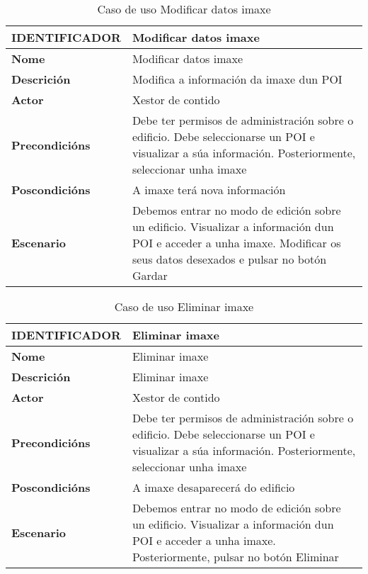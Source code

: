 \begin{table}[tbp]
	\begin{tabular}{|l|p{10cm}|}
		\hline 
		\textbf{IDENTIFICADOR}	& \textbf{Modificar datos imaxe} \\ 
		\hline 
		\textbf{Nome} & Modificar datos imaxe \\ 
		\hline 
		\textbf{Descrición} & Modifica a información da imaxe dun POI \\ 
		\hline 
		\textbf{Actor} & Xestor de contido \\ 
		\hline 
		\textbf{Precondicións} & Debe ter permisos de administración sobre o edificio. Debe seleccionarse un POI e visualizar a súa información. Posteriormente, seleccionar unha imaxe \\ 
		\hline 
		\textbf{Poscondicións} & A imaxe terá nova información \\ 
		\hline 
		\textbf{Escenario} & Debemos entrar no modo de edición sobre un edificio. Visualizar a información dun POI e acceder a unha imaxe. Modificar os seus datos desexados e pulsar no botón Gardar \\ 
		\hline 
	\end{tabular}
	\caption{Caso de uso Modificar datos imaxe}
	\label{tab:cuModificarImaxe}
\end{table}

\begin{table}[tbp]
	\begin{tabular}{|l|p{10cm}|}
		\hline 
		\textbf{IDENTIFICADOR}	& \textbf{Eliminar imaxe} \\ 
		\hline 
		\textbf{Nome} & Eliminar imaxe \\ 
		\hline 
		\textbf{Descrición} & Eliminar imaxe \\ 
		\hline 
		\textbf{Actor} & Xestor de contido \\ 
		\hline 
		\textbf{Precondicións} & Debe ter permisos de administración sobre o edificio. Debe seleccionarse un POI e visualizar a súa información. Posteriormente, seleccionar unha imaxe \\ 
		\hline 
		\textbf{Poscondicións} & A imaxe desaparecerá do edificio \\ 
		\hline 
		\textbf{Escenario} & Debemos entrar no modo de edición sobre un edificio. Visualizar a información dun POI e acceder a unha imaxe. Posteriormente, pulsar no botón Eliminar \\ 
		\hline 
	\end{tabular}
	\caption{Caso de uso Eliminar imaxe}
	\label{tab:cuEliminarImaxe}
\end{table}

